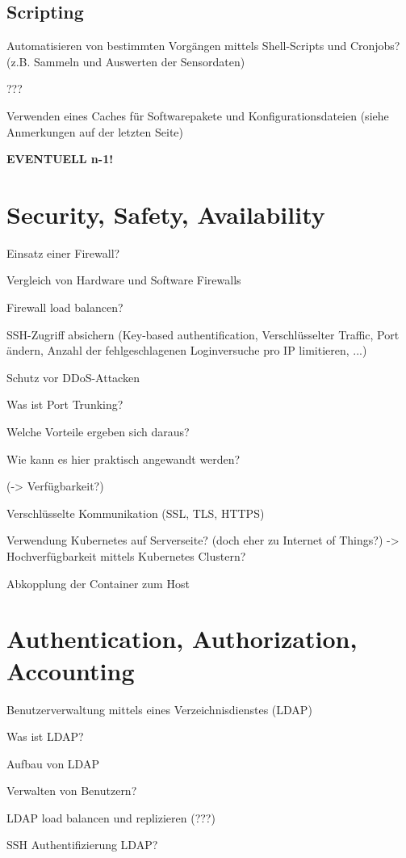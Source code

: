 \subsection{Scripting}
\label{subsec:Scripting}
Automatisieren von bestimmten Vorgängen mittels Shell-Scripts und Cronjobs? (z.B. Sammeln und Auswerten der Sensordaten)

???

Verwenden eines Caches für Softwarepakete und Konfigurationsdateien (siehe Anmerkungen auf der letzten Seite)


\textbf{EVENTUELL n-1!}

\section{Security, Safety, Availability}
\label{sec:Security, Safety, Availability}
Einsatz einer Firewall?

Vergleich von Hardware und Software Firewalls

Firewall load balancen?

SSH-Zugriff absichern (Key-based authentification, Verschlüsselter Traffic, Port ändern, Anzahl der fehlgeschlagenen Loginversuche pro IP limitieren, ...)

Schutz vor DDoS-Attacken

Was ist Port Trunking?

Welche Vorteile ergeben sich daraus?

Wie kann es hier praktisch angewandt werden?

(-> Verfügbarkeit?)

Verschlüsselte Kommunikation (SSL, TLS, HTTPS)

Verwendung Kubernetes auf Serverseite? (doch eher zu Internet of Things?) -> Hochverfügbarkeit mittels Kubernetes Clustern?

Abkopplung der Container zum Host

\section{Authentication, Authorization, Accounting}
\label{sec:Authentication, Authorization, Accounting}
Benutzerverwaltung mittels eines Verzeichnisdienstes (LDAP)

Was ist LDAP?

Aufbau von LDAP

Verwalten von Benutzern?

LDAP load balancen und replizieren (???)

SSH Authentifizierung LDAP?

